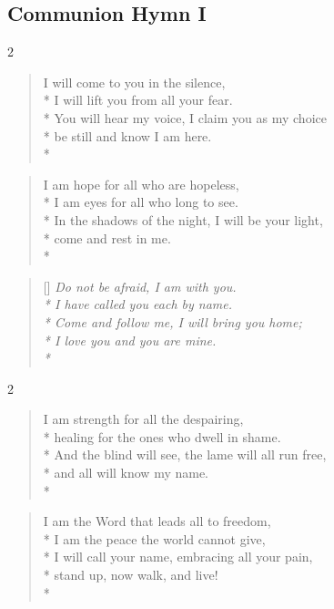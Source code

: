 \documentclass[12pt]{article}
\newcounter{count}
\newcommand\printcount{\addtocounter{count}{1}\thecount}
\begin{document}
\begin{center}
\subsection*{Communion Hymn I}
\end{center}
\begin{multicols}{2}
\setcounter{count}{0}
\begin{verse}
\flagverse{\printcount.} I will come to you in the silence,\\*
I will lift you from all your fear.\\*
You will hear my voice, I claim you as my choice\\*
be still and know I am here.\\*
\end{verse}

\begin{verse}
\flagverse{\printcount.} I am hope for all who are hopeless,\\*
I am eyes for all who long to see.\\*
In the shadows of the night, I will be your light,\\*
come and rest in me.\\*
\end{verse}
\end{multicols}

\settowidth{\versewidth}{Come and follow me, I will bring you home;}
\begin{verse}[\versewidth]
\textit{Do not be afraid, I am with you.\\*
I have called you each by name.\\*
Come and follow me, I will bring you home;\\*
I love you and you are mine.\\*}
\end{verse}

\begin{multicols}{2}
\begin{verse}
\flagverse{\printcount.} I am strength for all the despairing,\\*
healing for the ones who dwell in shame.\\*
And the blind will see, the lame will all run free,\\*
and all will know my name.\\*
\end{verse}

\begin{verse}
\flagverse{\printcount.} I am the Word that leads all to freedom,\\*
I am the peace the world cannot give,\\*
I will call your name, embracing all your pain,\\*
stand up, now walk, and live!\\*
\end{verse}
\end{multicols}
\end{document}
